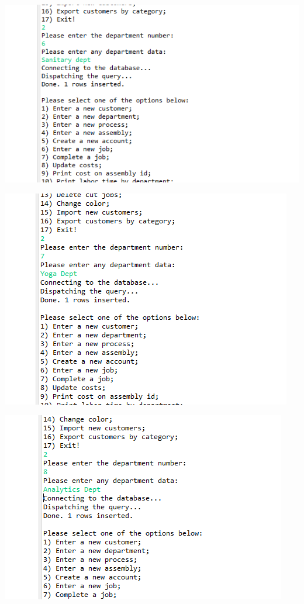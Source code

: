 \documentclass[11pt]{article}
\begin{document}
\includegraphics[width = \textwidth]{dept3.png}

\includegraphics[width = \textwidth]{dept4.png}

\includegraphics[width = \textwidth]{dept5.png}
\end{document}
